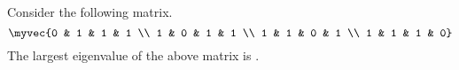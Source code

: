     \item Consider the following matrix.
    \[ \myvec{0 & 1 & 1 & 1 \\ 1 & 0 & 1 & 1 \\ 1 & 1 & 0 & 1 \\ 1 & 1 & 1 & 0} \]
    The largest eigenvalue of the above matrix is \underline{\hspace{2cm}}.
    \hfill{}
